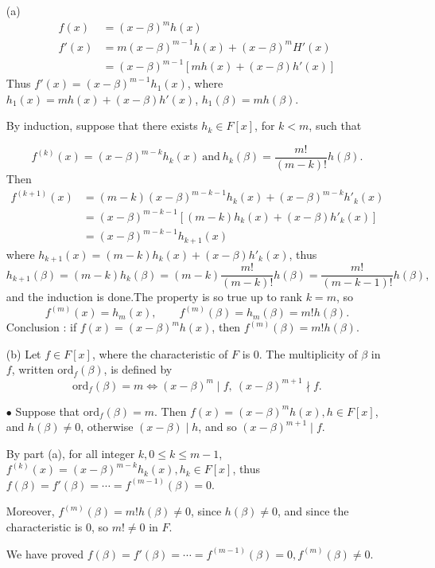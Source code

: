 \documentclass[11pt,a4paper]{article}
\begin{document}
\begin{enumerate}
\item[(a)]
\begin{align*}
f(x) &=(x-\beta)^m h(x)\\
f'(x) &=m(x-\beta)^{m-1} h(x) +(x-\beta)^m H'(x)\\
&=(x-\beta)^{m-1} [mh(x)+(x-\beta) h'(x)]
\end{align*}
Thus $f'(x) = (x-\beta)^{m-1} h_1(x)$, where $h_1(x) = mh(x)+(x-\beta) h'(x)$, $h_1(\beta) = mh(\beta)$.

By induction, suppose that there exists $h_k \in F[x]$, for $k<m$, such that 

$$f^{(k)}(x) = (x-\beta)^{m-k} h_k(x)\ \mathrm{and}\ h_k(\beta) = \frac{m!}{(m-k)!} h(\beta).$$
Then
\begin{align*}
f^{(k+1)}(x) &= (m-k) (x-\beta)^{m-k-1} h_k(x) +(x-\beta)^{m-k}h'_k(x)\\
&=(x-\beta)^{m-k-1}[(m-k) h_k(x) + (x-\beta) h'_k(x)]\\
&= (x-\beta)^{m-k-1} h_{k+1}(x)
\end{align*}
where $h_{k+1}(x) = (m-k) h_k(x) + (x-\beta) h'_k(x)$, thus $$h_{k+1}(\beta) = (m-k)h_k(\beta) = (m-k)  \frac{m!}{(m-k)!} h(\beta) =  \frac{m!}{(m-k-1)!} h(\beta),$$
and the induction is done.The property is so true up to rank $k=m$, so
$$f^{(m)}(x) = h_m(x),\qquad f^{(m)}(\beta) = h_m(\beta) = m! h(\beta).$$
Conclusion : if $f(x) =(x-\beta)^m h(x)$, then $f^{(m)}(\beta) = m! h(\beta)$.

\item[(b)] Let $f\in F[x]$, where the characteristic of $F$ is 0. The multiplicity of  $\beta$ in $f$, written  $\mathrm{ord}_f(\beta)$, is defined by
$$\mathrm{ord}_f(\beta) = m \iff (x-\beta)^m \mid f , \ (x-\beta)^{m+1} \nmid f.$$

$\bullet$ Suppose that $\mathrm{ord}_f(\beta)=m$. Then $f(x) = (x-\beta)^m h(x) , h \in F[x]$, and $h(\beta) \neq 0$, otherwise $(x-\beta) \mid h$, and so $(x-\beta)^{m+1} \mid f$.

By part (a), for all integer $k, 0 \leq k \leq m-1$, $f^{(k)}(x) = (x-\beta)^{m-k} h_k(x), h_k \in F[x]$, thus $f(\beta) = f'(\beta) = \cdots = f^{(m-1)}(\beta) = 0$.

Moreover, $f^{(m)}(\beta) = m! h(\beta) \neq 0$, since $h(\beta) \neq 0$, and since the characteristic is 0, so $m!\neq 0$ in $F$.

We have proved $f(\beta) = f'(\beta) = \cdots = f^{(m-1)}(\beta) = 0, f^{(m)}(\beta)\neq 0$.


\end{enumerate}
\end{document}
